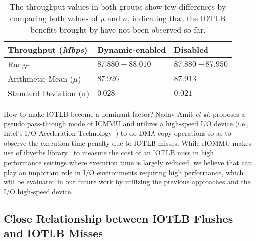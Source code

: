 \begin{table}[!ht]
\footnotesize
\begin{center}
\begin{tabular}{|l|l|l|}
\hline
{\textbf{Throughput (\emph{Mbps})}} & {\textbf{Dynamic-enabled}} & {\textbf{Disabled}}    \\ \hline
Range & $87.880-88.010$ & $87.880-87.950$ \\ \hline
Arithmetic Mean ($\mu$)  &  $87.926$ & $87.913$ \\ \hline
Standard Deviation ($\sigma$) &  $0.028$ & $0.021$ \\ \hline
\end{tabular}
\end{center}
\caption{The throughput values in both groups show few differences by comparing both values of $\mu$ and $\sigma$, indicating that the IOTLB benefits brought by \name have not been observed so far.}
\label{tab:netperf}
\end{table}

How to make IOTLB become a dominant factor? Nadav Amit \emph{et al.} proposes a pseudo pass-through mode of IOMMU and utilizes a high-speed I/O device (i.e., Intel’s I/O Acceleration Technology~\cite{lauritzenintel}) to do DMA copy operations so as to observe the execution time penalty due to IOTLB misses. While rIOMMU makes use of ibverbs library~\cite{ibverbsevaluation,kerr2011dissecting} to measure the cost of an IOTLB miss in high performance settings where execution time is largely reduced.
we believe that \name can play an important role in I/O environments requiring high performance, which will be evaluated in our future work by utilizing the previous approaches and the I/O high-speed device.

\subsection{Close Relationship between IOTLB Flushes and IOTLB Misses}

